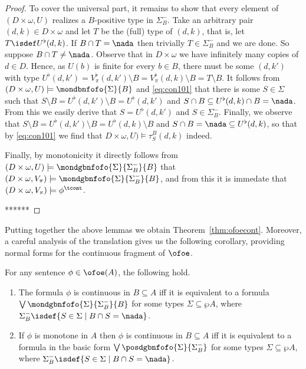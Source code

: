 \begin{proof}
To cover the universal part, it remains to show that every element of 
$(D\times\omega, U)$ realizes a $B$-positive type in $\Sigma^{-}_{B}$.
Take an arbitrary pair $(d,k) \in D\times\omega$ and let $T$ be the (full) type 
of $(d,k)$, that is, let $T \isdef U^{\flat}(d,k)$.
If $B \cap T = \nada$ then trivially $T\in \Sigma^{-}_{B}$ and we are done. 
So suppose $B \cap T \neq \nada$. 
Observe that in $D\times\omega$ we have infinitely many copies of $d\in D$.
Hence, as $U(b)$ is finite for every $b \in B$, there must be some $(d,k')$ 
with type $U^{\flat}(d,k') = V_{\pi}^{\flat}(d,k') \setminus B = 
V_{\pi}^{\flat}(d,k) \setminus B = T \setminus B$.
It follows from $(D\times\omega, U) \models \mondbnfofo{\Sigma}{B}$ and 
\eqref{eq:con101} that there is some $S \in \Sigma$ such that
$S \setminus B = U^{\flat}(d,k') \setminus B = U^{\flat}(d,k')$ and 
$S \cap B \subseteq U^{\flat}(d,k) \cap B = \nada$.
From this we easily derive that $S = U^{\flat}(d,k')$ and $S \in \Sigma^{-}_{B}$.
Finally, we observe that $S \setminus B = U^{\flat}(d,k') \setminus B =
U^{\flat}(d,k) \setminus B$ and $S \cap B = \nada \subseteq U^{\flat}(d,k)$, 
so that by \eqref{eq:con101} we find that $D \times \omega,U) \models 
\tau^{B}_{S}(d,k)$ indeed.

Finally, by monotonicity it directly follows from
$(D\times\omega, U) \models \mondgbnfofo{\Sigma}{\Sigma^{-}_{B}}{B}$
that 
$(D\times\omega, V_{\pi}) \models \mondgbnfofo{\Sigma}{\Sigma^{-}_{B}}{B}$,
and from this it is immedate that $(D\times\omega, V_\pi) \models \phi^\tcont$.
\bigskip

******


\end{proof}

Putting together the above lemmas we obtain Theorem~\ref{thm:ofoecont}. 
Moreover, a careful analysis of the translation gives us the following corollary,
providing normal forms for the continuous fragment of $\ofoe$.

\begin{corollary}\label{cor:ofoecontinuousnf}
For any sentence $\phi \in \ofoe(A)$, the following hold.
\begin{enumerate}
\item 
The formula $\phi$ is continuous in $B \subseteq A$ iff it is equivalent to a 
formula $\bigvee \mondgbnfofo{\Sigma}{\Sigma^{-}_{B}}{B}$ for some types $\Sigma
\subseteq \wp A$, where $\Sigma^{-}_{B} \isdef \{S\in \Sigma \mid B \cap S = 
\nada \}$.
\item 
If $\phi$ is monotone in $A$ 
then $\phi$ is continuous in $B \subseteq A$ iff it is equivalent to a formula 
in the basic form $\bigvee \posdgbnfofo{\Sigma}{\Sigma^{-}_{B}}$ for some types 
$\Sigma \subseteq \wp A$, where $\Sigma^{-}_{B} \isdef \{S\in \Sigma \mid B \cap
S = \nada \}$.
\end{enumerate}
\end{corollary}

